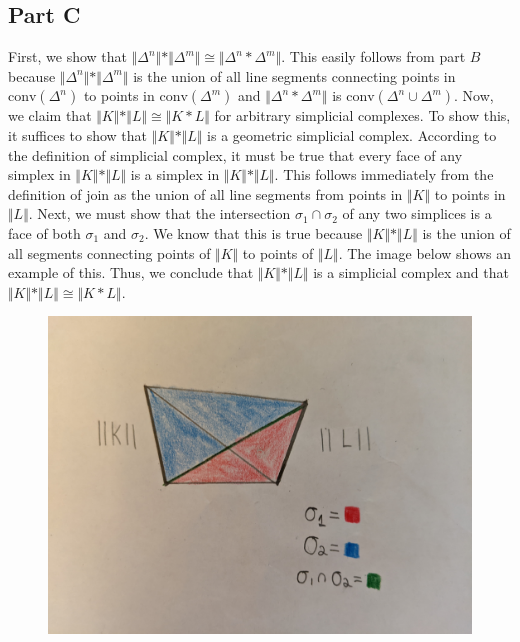 \documentclass[12pt]{article}
\begin{document}
\subsection*{Part C}
First, we show that $\Vert \Delta^n \Vert * \Vert \Delta^m\Vert \cong \Vert \Delta^n * \Delta^m \Vert$. This easily follows from part $B$ because $\Vert \Delta^n \Vert * \Vert \Delta^m\Vert$ is the union of all line segments connecting points in $\text{conv}(\Delta^n)$ to points in $\text{conv}(\Delta^m)$ and $\Vert \Delta^n * \Delta^m \Vert$ is $\text{conv}(\Delta^n \cup \Delta^m)$. Now, we claim that $\Vert K \Vert * \Vert L \Vert \cong \Vert K * L \Vert$ for arbitrary simplicial complexes. To show this, it suffices to show that $\Vert K \Vert * \Vert L \Vert$ is a geometric simplicial complex. According to the definition of simplicial complex, it must be true that every face of any simplex in $\Vert K \Vert * \Vert L \Vert$ is a simplex in $\Vert K \Vert * \Vert L \Vert$. This follows immediately from the definition of join as the union of all line segments from points in $\Vert K \Vert$ to points in $\Vert L \Vert$. Next, we must show that the intersection $\sigma_1 \cap \sigma_2$ of any two simplices is a face of both $\sigma_1$ and $\sigma_2$. We know that this is true because $\Vert K \Vert * \Vert L \Vert$ is the union of all segments connecting points of $\Vert K \Vert$ to points of $\Vert L \Vert$. The image below shows an example of this. Thus, we conclude that $\Vert K \Vert * \Vert L \Vert$ is a simplicial complex and that $\Vert K \Vert * \Vert L \Vert \cong \Vert K * L \Vert$.
\begin{figure}[H]
\centering
\includegraphics[width=\textwidth]{Image1}
\end{figure}
\newpage
\end{document}
